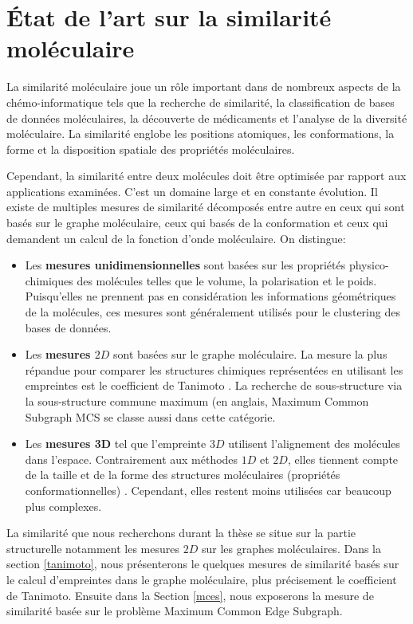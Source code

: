 \chapter{État de l'art sur la similarité moléculaire}
\label{chap2}

La similarité moléculaire joue un rôle important dans de nombreux aspects de la chémo-informatique tels que la recherche de similarité, la classification de bases de données moléculaires, la découverte de médicaments et l'analyse de la diversité moléculaire. La similarité englobe les positions atomiques, les conformations, la forme et la disposition spatiale des propriétés moléculaires\cite{dean2012molecular}. 

Cependant, la similarité entre deux molécules doit être optimisée par rapport aux applications examinées. C'est un domaine large et en constante évolution. Il existe de multiples mesures de similarité décomposés entre autre en ceux qui sont basés sur le graphe moléculaire, ceux qui basés de la conformation et ceux qui demandent un calcul de la fonction d'onde moléculaire. On distingue: 

\begin{itemize}
\item Les \textbf{mesures unidimensionnelles}\cite{dixon2001one} sont basées sur les propriétés physico-chimiques des molécules telles que le volume, la polarisation et le poids. Puisqu'elles ne prennent pas en considération les informations géométriques de la molécules, ces mesures sont généralement utilisés pour le clustering des bases de données\cite{downs1994similarity}.

\item Les \textbf{mesures $2D$} sont basées sur le graphe moléculaire. La mesure la plus répandue pour comparer les structures chimiques représentées en utilisant les empreintes est le coefficient de Tanimoto \cite{bajusz2015tanimoto}. La recherche de sous-structure via la sous-structure commune maximum (en anglais, Maximum Common Subgraph MCS\cite{rascal} se classe aussi dans cette catégorie.

\item Les  \textbf{mesures 3D} tel que l'empreinte $3D$ utilisent l'alignement des molécules dans l'espace. Contrairement aux méthodes $1D$ et $2D$, elles tiennent compte de la taille et de la forme des structures moléculaires (propriétés conformationnelles) \cite{shin2015three}.
Cependant, elles restent moins utilisées car beaucoup plus complexes\cite{bero2017similarity, barbosa}.

\end{itemize}
La similarité que nous recherchons durant la thèse se situe sur la partie structurelle notamment les mesures $2D$ sur les graphes moléculaires. Dans la section \ref{tanimoto}, nous présenterons le quelques mesures de similarité basés sur le calcul d'empreintes dans le graphe moléculaire, plus précisement le coefficient de Tanimoto. Ensuite dans la Section \ref{mces}, nous exposerons la mesure de similarité basée sur le problème Maximum Common Edge Subgraph. 

